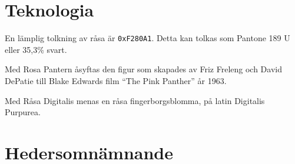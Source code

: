 \documentclass{dsekregulations}
\begin{document}
\coverpage
\section{Teknologia}
\begin{parasection}
   En lämplig tolkning av råsa är \texttt{0xF280A1}. Detta kan
  tolkas som Pantone 189 U eller 35,3\% svart.

   Med Rosa Pantern åsyftas den figur som skapades av
  Friz Freleng och David DePatie till Blake Edwards film ``The Pink Panther'' år
  1963.

   Med Råsa Digitalis menas en råsa fingerborgsblomma,
  på latin Digitalis Purpurea.
\end{parasection}

\section{Hedersomnämnande}
\end{document}
